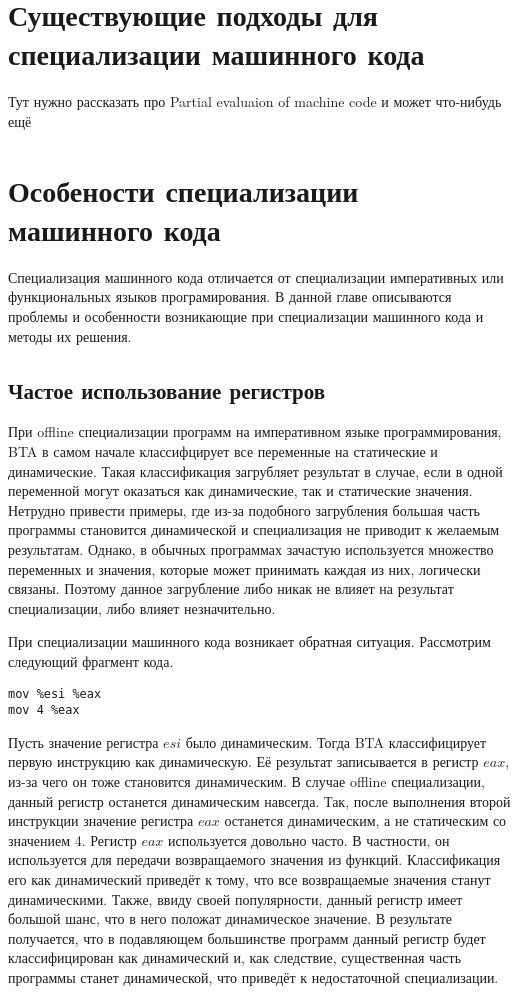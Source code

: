 \documentclass{spbau-diploma}
\begin{document}
\section{Существующие подходы для специализации машинного кода}

Тут нужно рассказать про Partial evaluaion of machine code и может что-нибудь ещё

\section{Особености специализации машинного кода}

Специализация машинного кода отличается от специализации императивных или функциональных языков програмирования. В данной главе описываются проблемы и особенности возникающие при специализации машинного кода и методы их решения.

\subsection{Частое использование регистров}
При offline специализации программ на императивном языке программирования, BTA в самом начале классифцирует все переменные на статические и динамические. Такая классификация загрубляет результат в случае, если в одной переменной могут оказаться как динамические, так и статические значения. Нетрудно привести примеры, где из-за подобного загрубления большая часть программы становится динамической и специализация не приводит к желаемым результатам. Однако, в обычных программах зачастую используется множество переменных и значения, которые может принимать каждая из них, логически связаны. Поэтому данное загрубление либо никак не влияет на результат специализации, либо влияет незначительно.

При специализации машинного кода возникает обратная ситуация. Рассмотрим следующий фрагмент кода.
\lstset{language=C}
\begin{lstlisting}
mov %esi %eax
mov 4 %eax
\end{lstlisting}
Пусть значение регистра $esi$ было динамическим. Тогда BTA классифицирует первую инструкцию как динамическую. Её результат записывается в регистр $eax$, из-за чего он тоже становится динамическим. В случае offline специализации, данный регистр останется динамическим навсегда. Так, после выполнения второй инструкции значение регистра $eax$ останется динамическим, а не статическим со значением 4. Регистр $eax$ используется довольно часто. В частности, он используется для передачи возвращаемого значения из функций. Классификация его как динамический приведёт к тому, что все возвращаемые значения станут динамическими. Также, ввиду своей популярности, данный регистр имеет большой шанс, что в него положат динамическое значение. В результате получается, что в подавляющем большинстве программ данный регистр будет классифицирован как динамический и, как следствие, существенная часть программы станет динамической, что приведёт к недостаточной специализации.
\end{document}
